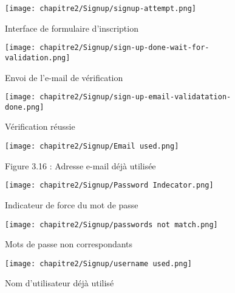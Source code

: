 \begin{figure}[h!]
\vspace*{0pt}
  \centering

  \begin{minipage}[t]{0.45\textwidth}
    \vspace*{0pt} %
    \centering
    \texttt{[image: chapitre2/Signup/signup-attempt.png]}
    \caption{Interface de formulaire d'inscription}
  \end{minipage}%
  \hspace{1cm}
  \begin{minipage}[t]{0.45\textwidth}
    \vspace*{0pt} %
    \centering
    \texttt{[image: chapitre2/Signup/sign-up-done-wait-for-validation.png]}
    \caption{Envoi de l'e-mail de vérification}
    \texttt{[image: chapitre2/Signup/sign-up-email-validatation-done.png]}
    \caption{Vérification réussie}
  \end{minipage}
\end{figure}
\begin{figure}[H]
  \centering

  \begin{minipage}[t]{0.45\textwidth}
    \centering
    \texttt{[image: chapitre2/Signup/Email used.png]}
    \caption{Figure 3.16 : Adresse e-mail déjà utilisée}
  \end{minipage}
  \hspace{1cm}
  \begin{minipage}[t]{0.45\textwidth}
    \centering
    \texttt{[image: chapitre2/Signup/Password Indecator.png]}
    \caption{Indicateur de force du mot de passe}
  \end{minipage}

\vspace{0.5cm} %
\end{figure}



\clearpage
\begin{figure}[H]
  \centering
  \begin{minipage}[t]{0.45\textwidth}
    \centering
    \texttt{[image: chapitre2/Signup/passwords not match.png]}
    \caption{Mots de passe non correspondants}
  \end{minipage}
  \hspace{1cm}
  \begin{minipage}[t]{0.45\textwidth}
    \centering
    \texttt{[image: chapitre2/Signup/username used.png]}
    \caption{Nom d'utilisateur déjà utilisé}
  \end{minipage}
\end{figure}


